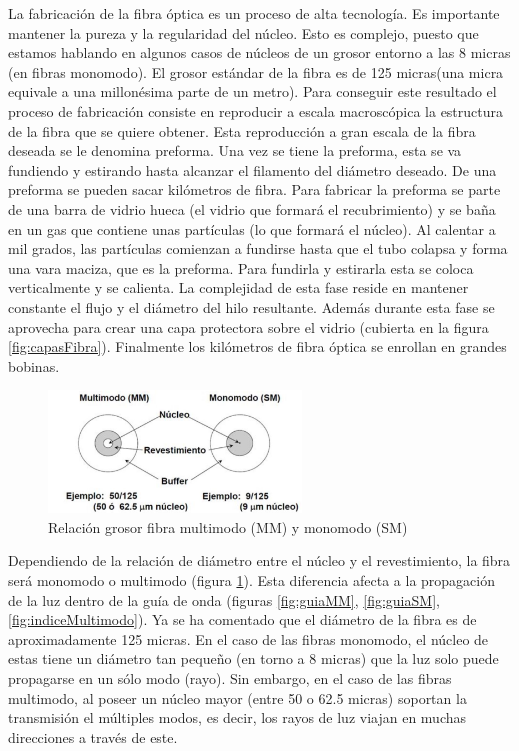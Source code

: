  La fabricación de la fibra óptica es un proceso de alta tecnología. Es importante mantener la pureza y la regularidad del núcleo. Esto es complejo, puesto que estamos hablando en algunos casos de núcleos de un grosor entorno a las 8 micras (en fibras monomodo). El grosor estándar de la fibra es de 125 micras(una micra equivale a una millonésima parte de un metro). Para conseguir este resultado el proceso de fabricación consiste en reproducir a escala macroscópica la estructura de la fibra que se quiere obtener. Esta reproducción a gran escala de la fibra deseada se le denomina preforma. Una vez se tiene la preforma, esta se va fundiendo y estirando hasta alcanzar el filamento del diámetro deseado. De una preforma se pueden sacar kilómetros de fibra. Para fabricar la preforma se parte de una barra de vidrio hueca (el vidrio que formará el recubrimiento) y se baña en un gas que contiene unas partículas (lo que formará el núcleo). Al calentar a mil grados, las partículas comienzan a fundirse hasta que el tubo colapsa y forma una vara maciza, que es la preforma. Para fundirla y estirarla esta se coloca verticalmente y se calienta. La complejidad de esta fase reside en mantener constante el flujo y el diámetro del hilo resultante. Además durante esta fase se aprovecha para crear una capa protectora sobre el vidrio (cubierta en la figura \ref{fig:capasFibra}). Finalmente los kilómetros de fibra óptica se enrollan en grandes bobinas. \cite{fabricacionFO}
 
  \begin{figure}[H]
 	\centering
 	\includegraphics[width=0.6\textwidth]{./img/MM-SM}
 	\caption{Relación grosor fibra multimodo (MM) y monomodo (SM) \cite{imgRadioModo} } 
 	\label{fig:modoMonoMulti}
 \end{figure} 
 
  Dependiendo de la relación de diámetro entre el núcleo y el revestimiento, la fibra será monomodo o multimodo (figura \ref{fig:modoMonoMulti}). Esta diferencia afecta a la propagación de la luz dentro de la guía de onda (figuras \ref{fig:guiaMM}, \ref{fig:guiaSM}, \ref{fig:indiceMultimodo}). Ya se ha comentado que el diámetro de la fibra es de aproximadamente 125 micras. En el caso de las fibras monomodo, el núcleo de estas tiene un diámetro tan pequeño (en torno a 8 micras) que la luz solo puede propagarse en un sólo modo (rayo). Sin embargo, en el caso de las fibras multimodo, al poseer un núcleo mayor (entre 50 o 62.5 micras) soportan la transmisión el múltiples modos, es decir, los rayos de luz viajan en muchas direcciones a través de este. \cite{FOA} 
   
